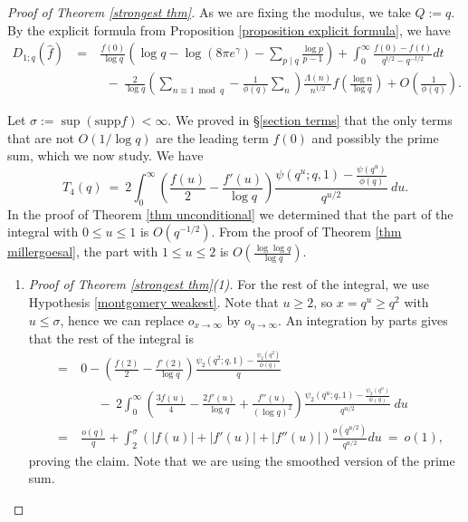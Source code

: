 \documentclass[12pt,reqno]{amsart}
\numberwithin{equation}{section}
\theoremstyle{plain}
\begin{document}
\begin{proof}[Proof of Theorem \ref{strongest thm}]
As we are fixing the modulus, we take $Q:=q$. By the explicit formula from Proposition \ref{proposition explicit formula}, we have
\begin{eqnarray}
D_{1;q}(\widehat{f}) & \ = \ & \frac{f(0)}{\log q} \left(  \log q -\log(8\pi e^{\gamma})-\sum_{p\mid q}\frac{\log p}{p-1}\right)
+\int_0^{\infty}\frac{f(0)-f(t)}{q^{t/2}-q^{-t/2}} dt \nonumber\\ && \ \ -\ \frac{2}{\log q} \left(\sum_{n\equiv 1 \bmod q}-\frac 1{\phi(q)}\sum_{n} \right)\frac{\Lambda(n)}{n^{1/2}} f\left(
\frac{\log n}{\log q}\right)+O\left(\frac{1}{\phi(q)}\right).
\end{eqnarray}

Let $\sigma:=\sup (\text{supp}f) < \infty$. We proved in \S\ref{section terms} that the only terms that are not $O(1/\log q)$ are the leading term $f(0)$ and possibly the prime sum, which we now study. We have
\begin{equation} T_4(q) \ =
\ 2 \int_0^{\infty} \left(\frac {f(u)}2 -\frac {f'(u)}{\log q}\right)\frac{\psi(q^u;q,1)-\frac{\psi(q^u)}{\phi(q)}}{q^{u/2}}\ du.\end{equation}
In the proof of Theorem \ref{thm unconditional} we determined that the part of the integral with $0\leq u\leq 1$ is $O(q^{-1/2})$. From the proof of Theorem \ref{thm millergoesal}, the part with $1\leq u\leq 2$ is $O(\frac{\log\log q}{\log q})$.\\

\begin{enumerate}

\item \emph{Proof of Theorem \ref{strongest thm}(1).} For the rest of the integral, we use Hypothesis \ref{montgomery weakest}. Note that $u\geq 2$, so $x=q^u\geq q^2$ with $u \le \sigma$, hence we can replace $o_{x\rightarrow \infty}$ by $o_{q\rightarrow \infty}$. An integration by parts gives that the rest of the integral is
\begin{eqnarray} &= \ & 0 - \left(\frac {f(2)}2 -\frac {f'(2)}{\log q}\right) \frac{\psi_2(q^2;q,1)-\frac{\psi_2(q^2)}{\phi(q)}}{q}  \nonumber\\
& & \ \ \ \ \ \ - \ 2 \int_0^{\infty} \left(\frac {3f(u)}4 -\frac {2f'(u)}{\log q} +\frac {f''(u)}{(\log q)^2}\right)\frac{\psi_2(q^u;q,1)-\frac{\psi_2(q^u)}{\phi(q)}}{q^{u/2}}\ du\nonumber\\
&= \ & \frac{o(q)}{q}+\int_{2}^{\sigma} \left(|f(u)|+|f'(u)|+|f''(u)|\right) \frac{o(q^{u/2})}{q^{u/2}} du \ = \ o(1),
\end{eqnarray}
proving the claim. Note that we are using the smoothed version of the prime sum.\\


\end{enumerate}
\end{proof}
\end{document}
